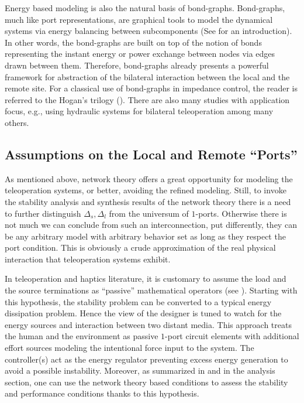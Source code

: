 Energy based modeling is also the natural basis of bond-graphs. Bond-graphs, much like port representations, are graphical tools 
to model the dynamical systems via energy balancing between subcomponents (See \cite{gawthrop} for an introduction). In other words, 
the bond-graphs are built on top of the notion of bonds representing the instant energy or power exchange between nodes via edges 
drawn between them. Therefore, bond-graphs already presents a powerful framework for abstraction of the bilateral interaction between 
the local and the remote site. For a classical use of bond-graphs in impedance control, the reader is referred to the Hogan's trilogy 
(\cite{hogan:1,hogan:2,hogan:3}). There are also many studies with application focus, e.g., \cite{krishnaswamy} using hydraulic 
systems for bilateral teleoperation among many others. 



\subsection{Assumptions on the Local and Remote \enquote{Ports}}

As mentioned above, network theory offers a great opportunity for modeling the teleoperation systems, or better, avoiding 
the refined modeling. Still, to invoke the stability analysis and synthesis results of the network theory there is a need 
to further distinguish $\Delta_s,\Delta_l$ from the universum of $1$-ports. Otherwise there is not much we can conclude 
from such an interconnection, put differently, they can be any arbitrary model with arbitrary behavior set as long as they 
respect the port condition. This is obviously a crude approximation of the real physical interaction that teleoperation 
systems exhibit. 

In teleoperation and haptics literature, it is customary to assume the load and the source terminations as \enquote{passive}
mathematical operators (see ). Starting with this hypothesis, the stability problem can be converted to 
a typical energy dissipation problem. 
Hence the view of the designer is tuned to watch for the energy sources and interaction between two distant media. This approach 
treats the human and the environment as passive $1$-port circuit elements with additional effort sources modeling the 
intentional force input to the system. The controller(s) act as the energy regulator preventing excess energy generation 
to avoid a possible instability. Moreover, as summarized in  and in the analysis section, one can use the 
network theory based conditions to assess the stability and performance conditions thanks to this hypothesis.

